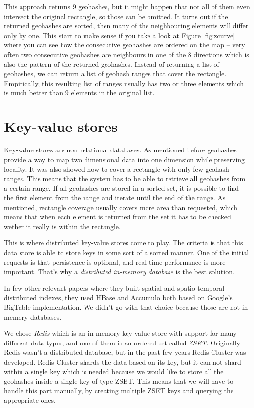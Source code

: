 \documentclass[times, utf8, diplomski]{fer}
\begin{document}
This approach returns 9 geohashes, but it might happen that not all of them even intersect the original rectangle, so those can be omitted. It turns out if the returned geohashes are sorted, then many of the neighbouring elements will differ only by one. This start to make sense if you take a look at Figure \ref{fig:zcurve} where you can see how the consecutive geohashes are ordered on the map -- very often two consecutive geohashes are neighbours in one of the 8 directions which is also the pattern of the returned geohashes. Instead of returning a list of geohashes, we can return a list of geohash ranges that cover the rectangle. Empirically, this resulting list of ranges usually has two or three elements which is much better than 9 elements in the original list.

\section{Key-value stores}
Key-value stores are non relational databases.
As mentioned before geohashes provide a way to map two dimensional data into one dimension while preserving locality. It was also showed how to cover a rectangle with only few geohash ranges. This means that the system has to be able to retrieve all geohashes from a certain range. If all geohashes are stored in a sorted set, it is possible to find the first element from the range and iterate until the end of the range. As mentioned, rectangle coverage usually covers more area than requested, which means that when each element is returned from the set it has to be checked wether it really is within the rectangle.

This is where distributed key-value stores come to play. The criteria is that this data store is able to store keys in some sort of a sorted manner. One of the initial requests is that persistence is optional, and real time performance is more important. That's why a \emph{distributed in-memory database} is the best solution.

In few other relevant papers where they built spatial \cite{spatialindex} and spatio-temporal \cite{spatiotemporal} distributed indexes, they used HBase and Accumulo both based on Google's BigTable implementation. We didn't go with that choice because those are not in-memory databases.

We chose \emph{Redis} which is an in-memory key-value store with support for many different data types, and one of them is an ordered set called \emph{ZSET}. Originally Redis wasn't a distributed database, but in the past few years Redis Cluster was developed. Redis Cluster shards the data based on its key, but it can not shard within a single key which is needed because we would like to store all the geohashes inside a single key of type ZSET. This means that we will have to handle this part manually, by creating multiple ZSET keys and querying the appropriate ones.
\end{document}
